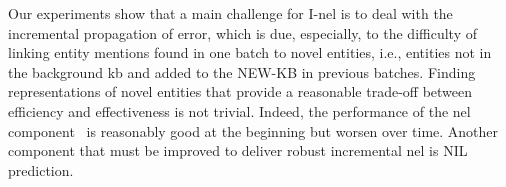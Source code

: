 Our experiments show that a main challenge for I-\ac{nel} is to deal with the incremental propagation of error, which is due, especially, to the difficulty of linking entity mentions found in one batch to novel entities, i.e., entities not in the background \ac{kb} and added to the NEW-KB in previous batches. 
Finding representations of novel entities that provide a reasonable trade-off between efficiency and effectiveness is not trivial.
Indeed, the performance of the \ac{nel} component~\cite{blink} is reasonably good at the beginning but worsen over time. Another component that must be improved to deliver robust incremental \ac{nel} is NIL prediction.      


